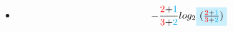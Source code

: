 \documentclass[xcolor=table]{beamer}
\begin{document}
\begin{frame}
\begin{itemize} \itemsep1pt \parskip0pt 
  \item[]  \begin{equation*}
  -\frac{\color{red}{2}\color{black}{+}\color{cyan}{1}}{\color{red}{3}\color{black}{+}\color{cyan}{2}}log_2
        \tikz[baseline]{
            \node[fill=cyan!20,anchor=base]
            {$ (\frac{\color{red}{2}\color{black}{+}\color{cyan}{1}}{\color{red}{3}\color{black}{+}\color{cyan}{2}})$};
        }
\end{equation*}
  
\end{itemize}

\end{frame}
\end{document}
